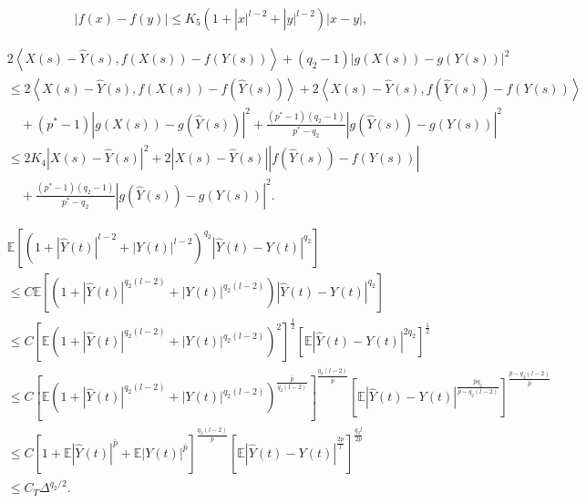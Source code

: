 \documentclass[10pt,a4paper]{amsart}
\begin{document}
\begin{equation}   \label{f}
	\left| {f(x) - f(y)} \right| \le {K_5}\left( {1 + |x{|^{l-2}} + |y{|^{l-2}}} \right)\left| {x - y} \right|,
\end{equation}

\begin{equation}    \label{ac5}
	\begin{split}
		&2\left\langle {X(s) - \hat Y(s),f(X(s)) - f( Y(s))} \right\rangle  + (q_2 - 1){\left| {g(X(s)) - g( Y(s))} \right|^2} \\
		&\le 2\left\langle {X(s) - \hat Y(s),f(X(s)) - f(\hat Y(s))} \right\rangle  + 2\left\langle {X(s) - \hat Y(s),f(\hat Y(s)) - f( Y(s))} \right\rangle  \\
		&\quad+ ({p^*} - 1){\left| {g(X(s)) - g(\hat Y(s))} \right|^2} + \frac{{({p^*} - 1)(q_2 - 1)}}{{{p^*} - q_2}}{\left| {g(\hat Y(s)) - g( Y(s))} \right|^2} \\
		&\le 2{K_4}{\left| {X(s) - \hat Y(s)} \right|^2} + 2\left| {X(s) - \hat Y(s)} \right|\left| {f(\hat Y(s)) - f( Y(s))} \right| \\
		&\quad+ \frac{{({p^*} - 1)(q_2 - 1)}}{{{p^*} - q_2}}{\left| {g(\hat Y(s)) - g( Y(s))} \right|^2}.
	\end{split}
\end{equation}

\begin{equation}  \label{lem-con-2}
	\begin{split}
		&\mathbb{E}\left[ {{{\left( {1 + {{\left| {\hat Y(t)} \right|}^{l - 2}} + {{\left| {Y(t)} \right|}^{l - 2}}} \right)}^{q_2}}{{\left| {\hat Y(t) - Y(t)} \right|}^{q_2}}} \right] \\
		&\le C\mathbb{E}\left[ {\left( {1 + {{\left| {\hat Y(t)} \right|}^{{q_2}(l - 2)}} + {{\left| {Y(t)} \right|}^{{q_2}(l - 2)}}} \right){{\left| {\hat Y(t) - Y(t)} \right|}^{q_2}}} \right] \\
		&\le C{\left[ {\mathbb{E}{{\left( {1 + {{\left| {\hat Y(t)} \right|}^{{q_2}(l - 2)}} + {{\left| {Y(t)} \right|}^{{q_2}(l - 2)}}} \right)}^2}} \right]^{\frac{1}{2}}}{\left[ {\mathbb{E}{{\left| {\hat Y(t) - Y(t)} \right|}^{2{q_2}}}} \right]^{\frac{1}{2}}} \\
		&\le C{\left[ {\mathbb{E}{{\left( {1 + {{\left| {\hat Y(t)} \right|}^{{q_2}(l - 2)}} + {{\left| {Y(t)} \right|}^{{q_2}(l - 2)}}} \right)}^{\frac{{\bar p}}{{{q_2}(l - 2)}}}}} \right]^{\frac{{{q_2}(l - 2)}}{{\bar p}}}}{\left[ {\mathbb{E}{{\left| {\hat Y(t) - Y(t)} \right|}^{\frac{{\bar p{q_2}}}{{\bar p - {q_2}(l - 2)}}}}} \right]^{\frac{{\bar p - {q_2}(l - 2)}}{{\bar p}}}} \\
		&\le C{\left[ {1 + \mathbb{E}{{\left| {\hat Y(t)} \right|}^{\bar p}} + \mathbb{E}{{\left| {Y(t)} \right|}^{\bar p}}} \right]^{\frac{{{q_2}(l - 2)}}{{\bar p}}}}{\left[ {\mathbb{E}{{\left| {\hat Y(t) - Y(t)} \right|}^{\frac{{2\bar p}}{l}}}} \right]^{\frac{{{q_2}l}}{{2\bar p}}}} \\
		&\le {C_T}{\Delta ^{{{q_2}}/{2}}} .
	\end{split}
\end{equation}
\end{document}
